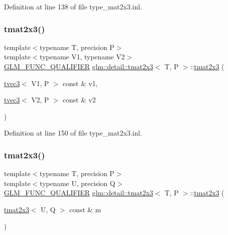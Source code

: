 Definition at line 138 of file type\+\_\+mat2x3.\+inl.

\mbox{\label{structglm_1_1detail_1_1tmat2x3_a883732d6b9178b86a9e5d10483fb6b92}} 
\subsubsection{\texorpdfstring{tmat2x3()}{tmat2x3()}\hspace{0.1cm}{\footnotesize\ttfamily [21/22]}}
{\footnotesize\ttfamily template$<$typename T, precision P$>$ \\
template$<$typename V1, typename V2$>$ \\
\hyperlink{setup_8hpp_a33fdea6f91c5f834105f7415e2a64407}{G\+L\+M\+\_\+\+F\+U\+N\+C\+\_\+\+Q\+U\+A\+L\+I\+F\+I\+ER} \hyperlink{structglm_1_1detail_1_1tmat2x3}{glm\+::detail\+::tmat2x3}$<$ T, P $>$\+::\hyperlink{structglm_1_1detail_1_1tmat2x3}{tmat2x3} (\begin{DoxyParamCaption}\item[{\hyperlink{structglm_1_1detail_1_1tvec3}{tvec3}$<$ V1, P $>$ const \&}]{v1,  }\item[{\hyperlink{structglm_1_1detail_1_1tvec3}{tvec3}$<$ V2, P $>$ const \&}]{v2 }\end{DoxyParamCaption})}



Definition at line 150 of file type\+\_\+mat2x3.\+inl.

\mbox{\label{structglm_1_1detail_1_1tmat2x3_a16af68f7f9699db992854c79210d8f32}} 
\subsubsection{\texorpdfstring{tmat2x3()}{tmat2x3()}\hspace{0.1cm}{\footnotesize\ttfamily [22/22]}}
{\footnotesize\ttfamily template$<$typename T, precision P$>$ \\
template$<$typename U, precision Q$>$ \\
\hyperlink{setup_8hpp_a33fdea6f91c5f834105f7415e2a64407}{G\+L\+M\+\_\+\+F\+U\+N\+C\+\_\+\+Q\+U\+A\+L\+I\+F\+I\+ER} \hyperlink{structglm_1_1detail_1_1tmat2x3}{glm\+::detail\+::tmat2x3}$<$ T, P $>$\+::\hyperlink{structglm_1_1detail_1_1tmat2x3}{tmat2x3} (\begin{DoxyParamCaption}\item[{\hyperlink{structglm_1_1detail_1_1tmat2x3}{tmat2x3}$<$ U, Q $>$ const \&}]{m }\end{DoxyParamCaption})}



